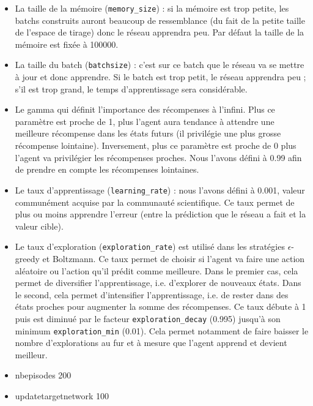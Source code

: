 \documentclass[10pt,a4paper]{article}
\begin{document}
\begin{itemize}
	\item La taille de la mémoire (\lstinline{memory_size}) : si la mémoire est trop petite, les batchs construits auront beaucoup de ressemblance (du fait de la petite taille de l'espace de tirage) donc le réseau apprendra peu. Par défaut la taille de la mémoire est fixée à 100000.
    \item La taille du batch (\lstinline{batchsize}) : c'est sur ce batch que le réseau va se mettre à jour et donc apprendre. Si le batch est trop petit, le réseau apprendra peu ; s'il est trop grand, le temps d'apprentissage sera considérable.
    \item Le gamma qui définit l'importance des récompenses à l'infini. Plus ce paramètre est proche de 1, plus l'agent aura tendance à attendre une meilleure récompense dans les états futurs (il privilégie une plus grosse récompense lointaine). Inversement, plus ce paramètre est proche de 0 plus l'agent va privilégier les récompenses proches. Nous l'avons défini à 0.99 afin de prendre en compte les récompenses lointaines.
    \item Le taux d'apprentissage (\lstinline{learning_rate}) : nous l'avons défini à 0.001, valeur communément acquise par la communauté scientifique. Ce taux permet de plus ou moins apprendre l'erreur (entre la prédiction que le réseau a fait et la valeur cible).
    \item Le taux d'exploration (\lstinline{exploration_rate}) est utilisé dans les stratégies $\epsilon$-greedy et Boltzmann. Ce taux permet de choisir si l'agent va faire une action aléatoire ou l'action qu'il prédit comme meilleure. Dans le premier cas, cela permet de diversifier l'apprentissage, i.e. d'explorer de nouveaux états. Dans le second, cela permet d'intensifier l'apprentissage, i.e. de rester dans des états proches pour augmenter la somme des récompenses. Ce taux débute à 1 puis est diminué par le facteur \lstinline{exploration_decay} (0.995) jusqu'à son minimum \lstinline{exploration_min} (0.01). Cela permet notamment de faire baisser le nombre d'explorations au fur et à mesure que l'agent apprend et devient meilleur.
    \item nbepisodes 200
    \item updatetargetnetwork 100 

\end{itemize}
\end{document}
